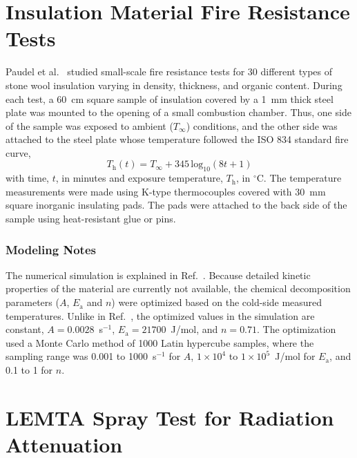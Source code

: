 \section{Insulation Material Fire Resistance Tests}
\label{Insulation_Materials_Description}

Paudel et al.~\cite{Paudel:2020} studied small-scale fire resistance tests for 30 different types of stone wool insulation varying in density, thickness, and organic content. During each test, a 60~cm square sample of insulation covered by a 1~mm thick steel plate was mounted to the opening of a small combustion chamber. Thus, one side of the sample was exposed to ambient ($ T_\infty $) conditions, and the other side was attached to the steel plate whose temperature followed the ISO 834 standard fire curve,
\begin{equation}
	T_\textrm{h}(t) = T_\infty + 345 \, \textrm{log}_{10}(8t + 1)
	\label{eq:isocurve}
\end{equation}
with time, $t$, in minutes and exposure temperature, $T_{\textrm{h}}$, in $^\circ$C. The temperature measurements were made using K-type thermocouples covered with 30~mm square inorganic insulating pads. The pads were attached to the back side of the sample using heat-resistant glue or pins.

\subsubsection{Modeling Notes}

The numerical simulation is explained in Ref.~\cite{Paudel:2020}. Because detailed kinetic properties of the material are currently not available, the chemical decomposition parameters ($A$, $E_{\textrm{a}}$ and $n$) were optimized based on the cold-side measured temperatures. Unlike in Ref.~\cite{Paudel:2020}, the optimized values in the simulation are constant, $A=0.0028$~s$^{-1}$, $E_{\textrm{a}}=21700$~J/mol, and $n=0.71$. The optimization used a Monte Carlo method of 1000 Latin hypercube samples, where the sampling range was 0.001 to 1000~s$^{-1}$ for $A$, $1\times10^4$ to $1\times10^5$~J/mol for $E_{\textrm{a}}$, and 0.1 to 1 for $n$.

\section{LEMTA Spray Test for Radiation Attenuation}
\label{LEMTA_Spray_Description}

